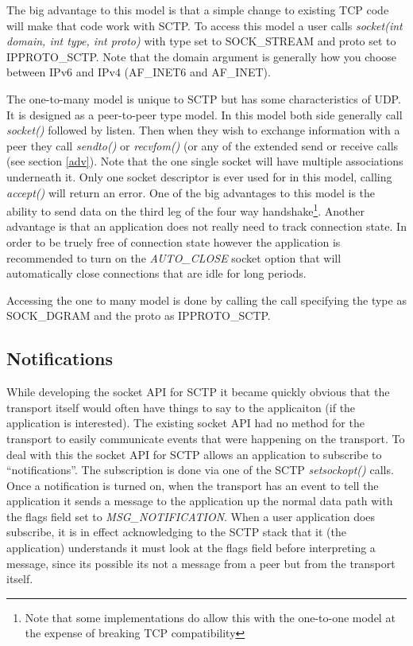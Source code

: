 \documentclass[conference]{IEEEtran}
\begin{document}
The big advantage to this model is that a simple change to 
existing TCP code will make that code work with SCTP. To access this model a user
calls \emph{socket(int domain,  int type, int proto)}
with type set to SOCK\_STREAM and proto set to IPPROTO\_SCTP. 
Note that the domain argument is generally how you choose between IPv6 
and IPv4 (AF\_INET6 and AF\_INET).

The one-to-many model is unique to SCTP but has some characteristics of UDP.
It is designed as a peer-to-peer type model.  In this model both side generally
call \emph{socket()} followed by listen. Then when they wish to exchange information
with a peer they call \emph{sendto()} or \emph{recvfom()} (or any of the extended send or receive
calls (see section \ref{adv}). Note that the one single  socket will have multiple
associations underneath it. Only one socket descriptor is ever used for
in this model, calling \emph{accept()} will return an error. One of the big advantages to this model is the
ability to send data on the third leg of the four way handshake\footnote{Note that some 
implementations do allow this with the one-to-one model at the expense of
breaking TCP compatibility}. Another advantage is that an application does not
really need to track connection state. In order to be truely free of connection
state however the application is recommended to turn on the \emph{AUTO\_CLOSE} socket option
that will automatically close connections that are idle for long periods. 

Accessing the one to many model is done by calling the call specifying the type as
SOCK\_DGRAM and the proto as IPPROTO\_SCTP.

\subsection{Notifications}

While developing the socket API for SCTP it became quickly obvious
that the transport itself would often have things to say to the applicaiton 
(if the application is interested). The existing socket API had no method
for the transport to easily communicate events that were happening
on the transport. To deal with this the socket API for SCTP allows an
application to subscribe to ``notifications''. The subscription is
done via one of the SCTP \emph{setsockopt()} calls. Once a
notification is turned on, when the transport has an event to tell
the application it sends a message to the application up the normal
data path with the flags field set to \emph{MSG\_NOTIFICATION}. When a
user application does subscribe, it is in effect acknowledging to the SCTP stack
that it (the application) understands it must look at the flags field before interpreting
a message, since its possible its not a message from a peer but from the transport
itself.
\end{document}
